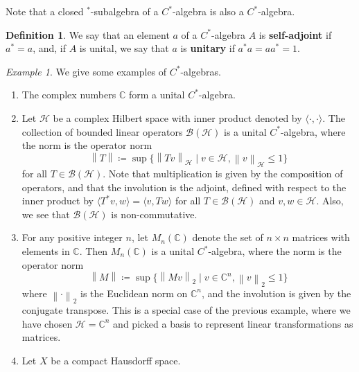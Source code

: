 \documentclass{article}
\theoremstyle{plain}
\theoremstyle{definition}
\newtheorem{definition}[theorem]{Definition}
\theoremstyle{remark}
\newtheorem{example}[theorem]{Example}
\newcommand{\norm}[1]{\left\lVert#1\right\rVert}
\begin{document}
Note that a closed $^*$-subalgebra of a $C^*$-algebra is also a $C^*$-algebra.

\begin{definition}
	We say that an element $a$ of a $C^{*}$-algebra 
	$A$ is \textbf{self-adjoint}
	if $a^* = a$, and, if $A$ is unital, we say that 
	$a$ is \textbf{unitary} if $a^*a = aa^* = 1$.
\end{definition}

\begin{example} \label{exCstaralgebras}
	We give some examples of $C^{*}$-algebras.
	\begin{enumerate}
		\item The complex numbers $\mathbb{C}$ form a unital $C^{*}$-algebra.
		\item Let $\mathcal{H}$ be a complex Hilbert space with inner product denoted by
			$\langle \cdot, \cdot \rangle$.
			The collection of bounded linear operators $\mathcal{B}(\mathcal{H})$
			is a unital $C^{*}$-algebra, 
			where the norm is the operator norm
			\begin{equation}
				\norm{T}
				\coloneqq
				\sup\{\norm{Tv}_\mathcal{H} \mid v \in \mathcal{H}, \norm{v}_\mathcal{H} \leq 1\}
			\end{equation}
			for all $T \in \mathcal{B}(\mathcal{H})$.
			Note that multiplication is given by the composition of operators,
			and that the involution is the adjoint, defined with respect
			to the inner product by 
			$\langle T^*v,w \rangle = \langle v, Tw \rangle$
			for all $T \in \mathcal{B}(\mathcal{H})$ and $v, w \in \mathcal{H}$.
			Also, we see that $\mathcal{B}(\mathcal{H})$ is non-commutative.
		\item For any positive integer $n$, let $M_n(\mathbb{C})$ denote the set
			of $n \times n$ matrices with elements in $\mathbb{C}$.
			Then $M_n(\mathbb{C})$ is a unital $C^{*}$-algebra,
			where the norm is the operator norm
			\begin{equation}
				\norm{M}
				\coloneqq
				\sup\{\norm{Mv}_2 \mid v \in \mathbb{C}^n, \norm{v}_2 \leq 1\}
			\end{equation}
			where $\norm{\cdot}_2$ is the Euclidean norm on $\mathbb{C}^n$,
			and the involution is given by the conjugate transpose.
			This is a special case of the previous example, where we 
			have chosen $\mathcal{H} = \mathbb{C}^n$ and picked a basis to represent 
			linear transformations as matrices.
		\item Let $X$ be a compact Hausdorff 
			space. 

\end{enumerate}
\end{example}
\end{document}
